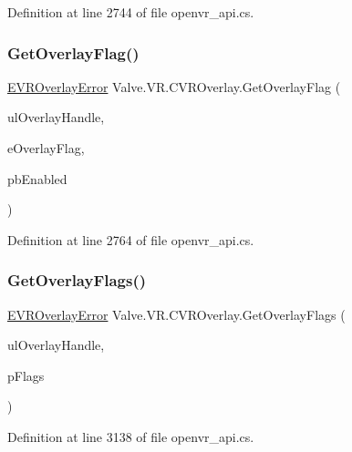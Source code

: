 Definition at line 2744 of file openvr\+\_\+api.\+cs.

\mbox{\label{class_valve_1_1_v_r_1_1_c_v_r_overlay_a12cddf2fd4ccd4456585f0826d3b531e}} 
\subsubsection{\texorpdfstring{GetOverlayFlag()}{GetOverlayFlag()}}
{\footnotesize\ttfamily \mbox{\hyperlink{namespace_valve_1_1_v_r_aaee5c5144f42b7969d45b854f51b0c18}{E\+V\+R\+Overlay\+Error}} Valve.\+V\+R.\+C\+V\+R\+Overlay.\+Get\+Overlay\+Flag (\begin{DoxyParamCaption}\item[{ulong}]{ul\+Overlay\+Handle,  }\item[{\mbox{\hyperlink{namespace_valve_1_1_v_r_a34c8e00ad63b95c5f533b1387bcab6ff}{V\+R\+Overlay\+Flags}}}]{e\+Overlay\+Flag,  }\item[{ref bool}]{pb\+Enabled }\end{DoxyParamCaption})}



Definition at line 2764 of file openvr\+\_\+api.\+cs.

\mbox{\label{class_valve_1_1_v_r_1_1_c_v_r_overlay_a53887eb449bfbd1548bb43b021f8a47e}} 
\subsubsection{\texorpdfstring{GetOverlayFlags()}{GetOverlayFlags()}}
{\footnotesize\ttfamily \mbox{\hyperlink{namespace_valve_1_1_v_r_aaee5c5144f42b7969d45b854f51b0c18}{E\+V\+R\+Overlay\+Error}} Valve.\+V\+R.\+C\+V\+R\+Overlay.\+Get\+Overlay\+Flags (\begin{DoxyParamCaption}\item[{ulong}]{ul\+Overlay\+Handle,  }\item[{ref uint}]{p\+Flags }\end{DoxyParamCaption})}



Definition at line 3138 of file openvr\+\_\+api.\+cs.

